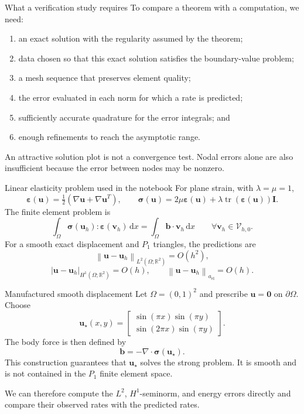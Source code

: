 \documentclass[11pt,aspectratio=169]{beamer}
\newcommand{\dd}{\,\mathrm{d}}
\newcommand{\Om}{\Omega}
\newcommand{\R}{\mathbb R}
\newcommand{\divg}{\nabla\!\cdot}
\newcommand{\norm}[2][]{\left\lVert#2\right\rVert_{#1}}
\newcommand{\seminorm}[2][]{\left\lvert#2\right\rvert_{#1}}
\newcommand{\bu}{\bm u}
\newcommand{\bv}{\bm v}
\newcommand{\beps}{\bm\varepsilon}
\newcommand{\bsig}{\bm\sigma}
\begin{document}
\begin{frame}{What a verification study requires}
To compare a theorem with a computation, we need:
\begin{enumerate}
  \item an exact solution with the regularity assumed by the theorem;
  \item data chosen so that this exact solution satisfies the boundary-value
  problem;
  \item a mesh sequence that preserves element quality;
  \item the error evaluated in each norm for which a rate is predicted;
  \item sufficiently accurate quadrature for the error integrals; and
  \item enough refinements to reach the asymptotic range.
\end{enumerate}
\vspace{0.25cm}

An attractive solution plot is not a convergence test. Nodal errors alone are
also insufficient because the error between nodes may be nonzero.
\end{frame}

\begin{frame}{Linear elasticity problem used in the notebook}
For plane strain, with $\lambda=\mu=1$,
\[
  \beps(\bu)=\tfrac12\left(\nabla\bu+\nabla\bu^T\right),
  \qquad
  \bsig(\bu)=2\mu\beps(\bu)
  +\lambda\operatorname{tr}(\beps(\bu))\bm I.
\]
The finite element problem is
\[
  \int_\Om \bsig(\bu_h):\beps(\bv_h)\dd x
  =\int_\Om \bm b\cdot\bv_h\dd x
  \qquad\forall\bv_h\in\mathcal V_{h,0}.
\]
For a smooth exact displacement and $P_1$ triangles, the predictions are
\[
  \norm[L^2(\Om;\R^2)]{\bu-\bu_h}=O(h^2),
\]
\[
  \seminorm[H^1(\Om;\R^2)]{\bu-\bu_h}=O(h),
  \qquad
  \norm[a_{\mathrm{el}}]{\bu-\bu_h}=O(h).
\]
\end{frame}

\begin{frame}{Manufactured smooth displacement}
Let $\Om=(0,1)^2$ and prescribe $\bu=\bm 0$ on $\partial\Om$. Choose
\[
  \bu_\star(x,y)=
  \begin{bmatrix}
    \sin(\pi x)\sin(\pi y)\\
    \sin(2\pi x)\sin(\pi y)
  \end{bmatrix}.
\]
The body force is then defined by
\[
  \bm b=-\divg\bsig(\bu_\star).
\]
This construction guarantees that $\bu_\star$ solves the strong problem. It
is smooth and is not contained in the $P_1$ finite element space.
\vspace{0.2cm}

We can therefore compute the $L^2$, $H^1$-seminorm, and energy errors directly
and compare their observed rates with the predicted rates.
\end{frame}
\end{document}
